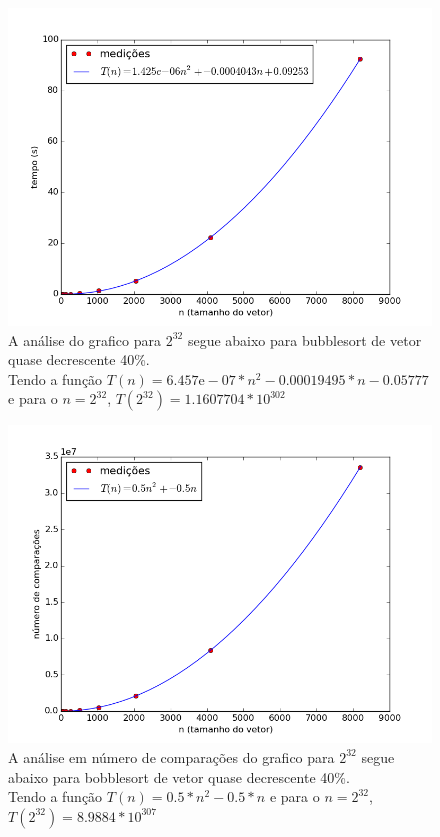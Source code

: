 \documentclass[12pt,a4paper,twoside]{report}
\begin{document}


\begin{figure}[ht]
\centering \includegraphics[scale=0.8]{../bolha/imagens/bolhaQuaseDecresc400.png}
\caption{A análise do grafico para $2^{32}$ segue abaixo para bubblesort de vetor quase decrescente 40\%.\\
Tendo a função $T(n) = 6.457\mathrm{e}-07*n^2-0.00019495*n-0.05777$ e para o $n =2^{32}$, $T(2^{32}) = 1.1607704 * 10^{302}$}
\label{fig:bolhaQuaseDecresc400}
\end{figure}

\begin{figure}[ht]
\centering \includegraphics[scale=0.8]{../bolha/imagens/bolhaQuaseDecresc401.png}
\caption{A análise em número de comparações do grafico para $2^{32}$ segue abaixo para bobblesort de vetor quase decrescente 40\%.\\
Tendo a função $T(n) = 0.5*n^2 - 0.5*n$ e para o $n =2^{32}$, $T(2^{32}) = 8.9884 * 10^{307}$}
\label{fig:bolhaQuaseDecresc401}
\end{figure}
\end{document}

